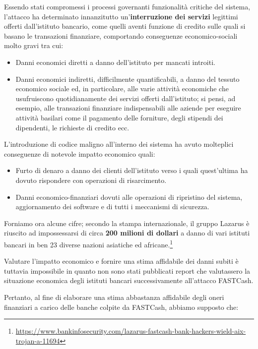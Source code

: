 \documentclass[10pt,a4paper, titlepage]{report}
\begin{document}
Essendo stati compromessi i processi governanti funzionalità critiche del sistema, l'attacco ha determinato innanzitutto un'\textbf{interruzione dei servizi} legittimi offerti dall'istituto bancario, come quelli aventi funzione di credito sulle quali si basano le transazioni finanziare, comportando conseguenze economico-sociali molto gravi tra cui:
\begin{itemize}
\item Danni economici diretti a danno dell'istituto per mancati introiti.
\item Danni economici indiretti, difficilmente quantificabili, a danno del tessuto economico sociale ed, in particolare, alle varie attività economiche che usufruiscono quotidianamente dei servizi offerti dall'istituto; si pensi, ad esempio, alle transazioni finanziare indispensabili  alle aziende per eseguire attività basilari come il pagamento delle forniture, degli stipendi dei dipendenti, le richieste di credito ecc. 
\end{itemize}

L'introduzione di codice maligno all'interno dei sistema ha avuto molteplici conseguenze di notevole impatto economico quali:
\begin{itemize}
\item Furto di denaro a danno dei clienti dell'istituto verso i quali quest'ultima ha dovuto rispondere con operazioni di risarcimento. 
\item Danni economico-finanziari dovuti alle operazioni di ripristino del sistema, aggiornamento dei software e di tutti i meccanismi di sicurezza.
\end{itemize}

Forniamo ora alcune cifre; secondo la stampa internazionale, il gruppo Lazarus è riuscito ad impossessarsi di circa \textbf{200 milioni di dollari} a danno di vari istituti bancari in ben 23 diverse nazioni asiatiche ed africane.\footnote{\url{https://www.bankinfosecurity.com/lazarus-fastcash-bank-hackers-wield-aix-trojan-a-11694}}

Valutare l'impatto economico e fornire una stima affidabile dei danni subiti è tuttavia impossibile in quanto non sono stati pubblicati report che valutassero la situazione economica degli istituti bancari successivamente all'attacco FASTCash. 

Pertanto, al fine di elaborare una stima abbastanza affidabile degli oneri finanziari a carico delle banche colpite da FASTCash, abbiamo supposto che:
\end{document}
